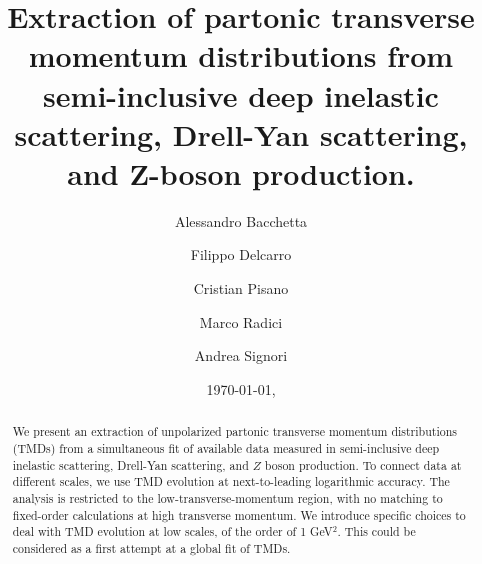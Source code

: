 \documentclass[aps,preprintnumbers,showpacs,nofootinbib,superscriptaddress,floatfix]{revtex4}
\begin{document}
\allowdisplaybreaks[2]


\title{
Extraction of partonic transverse momentum distributions 
from semi-inclusive deep
inelastic scattering, Drell-Yan scattering, and Z-boson production.
}

\author{Alessandro Bacchetta}

\author{Filippo Delcarro}

\author{Cristian Pisano}

\author{Marco Radici}

\author{Andrea Signori}

\begin{abstract}
We present an extraction of unpolarized partonic transverse momentum
distributions (TMDs) 
from a simultaneous fit of available data measured in semi-inclusive deep
inelastic scattering, 
Drell-Yan scattering, and $Z$ boson production. 
To connect data at different scales, we use TMD evolution at next-to-leading logarithmic accuracy. The
analysis is restricted to the low-transverse-momentum region, with no matching
to fixed-order calculations at high transverse momentum. We introduce specific
choices to deal with TMD evolution at low scales, of the order of 1 GeV$^2$.
This could be considered as a first attempt at a global fit of TMDs.
\end{abstract}


\date{\today, \currenttime}
\end{document}
